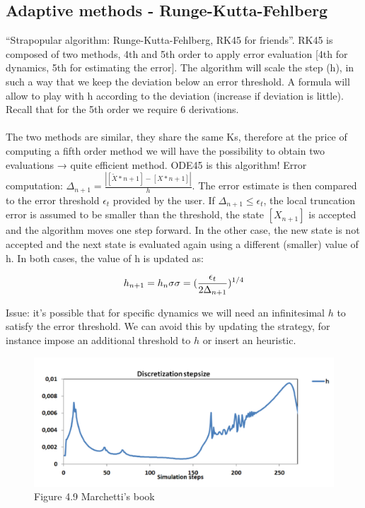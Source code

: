   \subsection{Adaptive methods - Runge-Kutta-Fehlberg}
  ``Strapopular algorithm: Runge-Kutta-Fehlberg, RK45 for friends''.
  RK45 is composed of two methods, 4th and 5th order to apply error evaluation {[}4th for dynamics, 5th for estimating the error{]}.
  The algorithm will scale the step (h), in such a way that we keep the deviation below an error threshold.
  A formula will allow to play with h according to the deviation (increase if deviation is little).
  Recall that for the 5th order we require 6 derivations.
  \\
  \\
  \noindent
  The two methods are similar, they share the same Ks, therefore at the price of computing a fifth order method we will have the possibility to obtain two evaluations → quite efficient method.
  ODE45 is this algorithm! Error computation: $\Delta_{n+1}=\frac{|[\tilde{X}*{n+1}]-[X*{n+1}]|}{h}$.
  The error estimate is then compared to the error threshold $\epsilon_t$ provided by the user.
  If $\Delta_{n+1}\leq \epsilon_t$, the local truncation error is assumed to be smaller than the threshold, the state $[X_{n+1}]$ is accepted and the algorithm moves one step forward.
  In the other case, the new state is not accepted and the next state is evaluated again using a different (smaller) value of h.
  In both cases, the value of h is updated as:

  $$h_{n+1}=h_n\sigma \\ \sigma =(\frac{\epsilon_t}{2\Delta_{n+1}})^{1/4}$$

\noindent
  Issue: it's possible that for specific dynamics we will need an infinitesimal $h$ to satisfy the error threshold.
  We can avoid this by updating the strategy, for instance impose an additional threshold to $h$ or insert an heuristic.


\begin{figure}
  \centering
   \includegraphics[width=\textwidth]{discretization.png}
  \caption{ Figure 4.9 Marchetti's book}
  \label{fig:discretization}
\end{figure}

